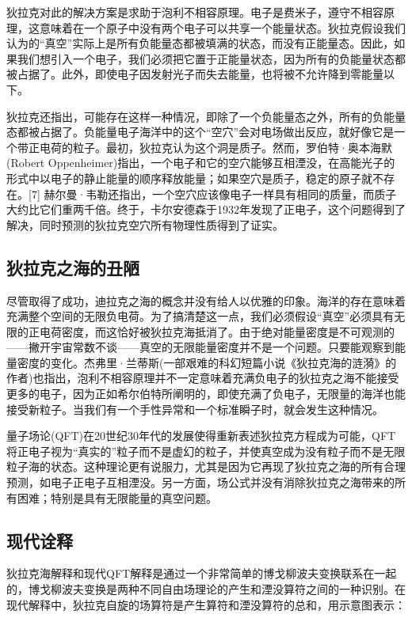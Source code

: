 狄拉克对此的解决方案是求助于泡利不相容原理。电子是费米子，遵守不相容原理，这意味着在一个原子中没有两个电子可以共享一个能量状态。狄拉克假设我们认为的“真空”实际上是所有负能量态都被填满的状态，而没有正能量态。因此，如果我们想引入一个电子，我们必须把它置于正能量状态，因为所有的负能量状态都被占据了。此外，即使电子因发射光子而失去能量，也将被不允许降到零能量以下。

狄拉克还指出，可能存在这样一种情况，即除了一个负能量态之外，所有的负能量态都被占据了。负能量电子海洋中的这个“空穴”会对电场做出反应，就好像它是一个带正电荷的粒子。最初，狄拉克认为这个洞是质子。然而，罗伯特·奥本海默(Robert Oppenheimer)指出，一个电子和它的空穴能够互相湮没，在高能光子的形式中以电子的静止能量的顺序释放能量；如果空穴是质子，稳定的原子就不存在。[7] 赫尔曼·韦勒还指出，一个空穴应该像电子一样具有相同的质量，而质子大约比它们重两千倍。终于，卡尔安德森于1932年发现了正电子，这个问题得到了解决，同时预测的狄拉克空穴所有物理性质得到了证实。

\subsection{狄拉克之海的丑陋}
尽管取得了成功，迪拉克之海的概念并没有给人以优雅的印象。海洋的存在意味着充满整个空间的无限负电荷。为了搞清楚这一点，我们必须假设“真空”必须具有无限的正电荷密度，而这恰好被狄拉克海抵消了。由于绝对能量密度是不可观测的——撇开宇宙常数不谈——真空的无限能量密度并不是一个问题。只要能观察到能量密度的变化。杰弗里·兰蒂斯(一部艰难的科幻短篇小说《狄拉克海的涟漪》的作者)也指出，泡利不相容原理并不一定意味着充满负电子的狄拉克之海不能接受更多的电子，因为正如希尔伯特所阐明的，即使充满了负电子，无限量的海洋也能接受新粒子。当我们有一个手性异常和一个标准瞬子时，就会发生这种情况。

量子场论(QFT)在20世纪30年代的发展使得重新表述狄拉克方程成为可能，QFT将正电子视为“真实的”粒子而不是虚幻的粒子，并使真空成为没有粒子而不是无限粒子海的状态。这种理论更有说服力，尤其是因为它再现了狄拉克之海的所有合理预测，如电子正电子互相湮没。另一方面，场公式并没有消除狄拉克之海带来的所有困难；特别是具有无限能量的真空问题。

\subsection{现代诠释}
狄拉克海解释和现代QFT解释是通过一个非常简单的博戈柳波夫变换联系在一起的，博戈柳波夫变换是两种不同自由场理论的产生和湮没算符之间的一种识别。在现代解释中，狄拉克自旋的场算符是产生算符和湮没算符的总和，用示意图表示：


